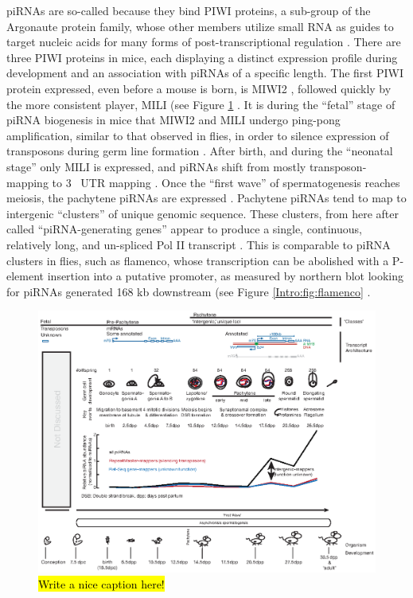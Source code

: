 {      piRNAs are so-called because they bind PIWI proteins, a sub-group of the Argonaute protein family, whose other members utilize small RNA as guides to target nucleic acids for many forms of post-transcriptional regulation \citep{Siomi2011}. There are three PIWI proteins in mice, each displaying a distinct expression profile during development and an association with piRNAs of a specific length. The first PIWI protein expressed, even before a mouse is born, is MIWI2 \citep{Carmell2007}, followed quickly by the more consistent player, MILI (see Figure \ref{Intro:fig:Mammalian piRNA classes} \citep{Kuramochi-Miyagawa2004, Aravin2006}. It is during the ``fetal'' stage of piRNA biogenesis in mice that MIWI2 and MILI undergo ping-pong amplification, similar to that observed in flies, in order to silence expression of transposons during germ line formation \citep{Brennecke2007, Kuramochi-Miyagawa2008}. After birth, and during the ``neonatal stage'' only MILI is expressed, and piRNAs shift from mostly transposon-mapping to 3\textprime~ UTR mapping \citep{Robine2009}. Once the ``first wave'' of spermatogenesis \citep{Oakberg1956b, Laiho2013a} reaches meiosis, the pachytene piRNAs are expressed \citep{Girard2006, Lau2006, Li2013h}. Pachytene piRNAs tend to map to intergenic ``clusters'' of unique genomic sequence. These clusters, from here after called ``piRNA-generating genes'' appear to produce a single, continuous, relatively long, and un-spliced Pol II transcript \citep{Li2013h}. This is comparable to piRNA clusters in flies, such as flamenco, whose transcription can be abolished with a P-element insertion into a putative promoter, as measured by northern blot looking for piRNAs generated 168 kb downstream (see Figure \ref{Intro:fig:flamenco} \citep{Brennecke2007}. 

      \begin{figure} %
      \centering 
      \includegraphics{Figures/Intro/MammalianPiRNAClassesOverTime.eps}
      \caption[Different Classes of mammalian piRNAs]
      {
        \hl{Write a nice caption here!}
        } \label{Intro:fig:Mammalian piRNA classes}
      \end{figure}

}

